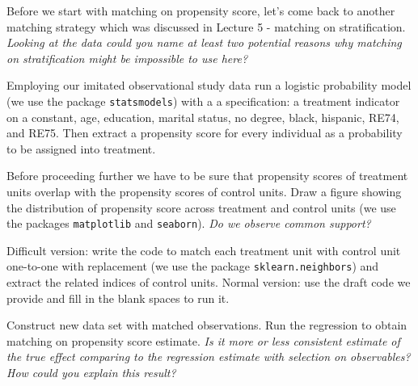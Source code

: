 \begin{boenumerate}

\item Before we start with matching on propensity score, let's come back to another matching strategy which was discussed in Lecture 5 - matching on stratification. \emph{Looking at the data could you name at least two potential reasons why matching on stratification might be impossible to use here?}

\item Employing our imitated observational study data run a logistic probability model (we use the package \texttt{statsmodels}) with a a specification: a treatment indicator on a constant, age, education, marital status, no degree, black, hispanic, RE74, and RE75. Then extract a propensity score for every individual as a probability to be assigned into treatment. 

\item Before proceeding further we have to be sure that propensity scores of treatment units overlap with the propensity scores of control units. Draw a figure  showing the distribution of propensity score across treatment and control units (we use the packages \texttt{matplotlib} and \texttt{seaborn}). \emph{Do we observe common support?}

\item Difficult version: write the code to match each treatment unit with control unit one-to-one with replacement (we use the package \texttt{sklearn.neighbors}) and extract the related indices of control units. Normal version: use the draft code we provide and fill in the blank spaces to run it. 

\item Construct new data set with matched observations. Run the regression to obtain matching on propensity score estimate. \emph{Is it more or less consistent estimate of the true effect comparing to the regression estimate with selection on observables? How could you explain this result?}

\end{boenumerate}






